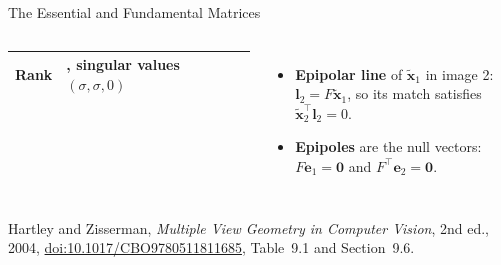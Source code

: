 \begin{frame}{The Essential and Fundamental Matrices}
\begin{columns}[T,onlytextwidth]
{\begin{tabular}{@{}>{\raggedright\arraybackslash}p{1.55cm} >{\raggedright\arraybackslash}p{2.2cm} >{\raggedright\arraybackslash}p{2.2cm}@{}}
        \addlinespace[0.3em]
        Rank & 2, singular values $(\sigma,\sigma,0)$ & 2 \\
        \bottomrule
      \end{tabular}\par}
      \vspace{0.4em}
      \begin{itemize}\footnotesize\itemsep0.3em
        \item \textbf{Epipolar line} of $\tilde{\mathbf{x}}_1$ in image 2: $\mathbf{l}_2=F\tilde{\mathbf{x}}_1$, so its match satisfies $\tilde{\mathbf{x}}_2^\top\mathbf{l}_2=0$.
        \item \textbf{Epipoles} are the null vectors: $F\mathbf{e}_1=\mathbf{0}$ and $F^\top\mathbf{e}_2=\mathbf{0}$.
      \end{itemize}
  \end{columns}
  \vspace{0.3em}
  {\scriptsize Hartley and Zisserman, \emph{Multiple View Geometry in Computer Vision}, 2nd ed., 2004, \href{https://doi.org/10.1017/CBO9780511811685}{doi:10.1017/CBO9780511811685}, Table~9.1 and Section~9.6.\par}
\end{frame}

